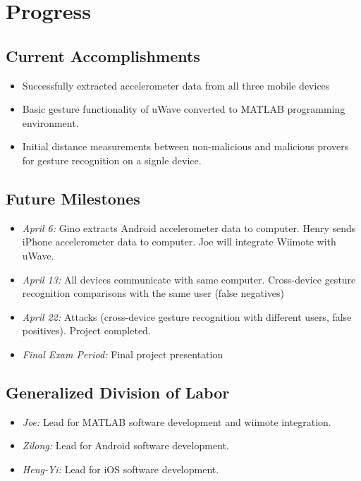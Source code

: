 
\section{Progress}
\label{sec:Progress}

\subsection{Current Accomplishments}

\begin{itemize}
\item Successfully extracted accelerometer data from all three mobile devices
\item Basic gesture functionality of uWave converted to MATLAB programming environment.
\item Initial distance measurements between non-malicious and malicious provers for gesture recognition on a signle device.
\end{itemize}

\subsection{Future Milestones}

\begin{itemize}
\item \emph{April 6:} Gino extracts Android accelerometer data to computer. Henry sends iPhone accelerometer data to computer. Joe will integrate Wiimote with uWave.  
\item \emph{April 13:} All devices communicate with same computer. Cross-device gesture recognition comparisons with the same user (false negatives)
\item \emph{April 22:} Attacks (cross-device gesture recognition with different users, false positives). Project completed. 
\item \emph{Final Exam Period:} Final project presentation
\end{itemize}

\subsection{Generalized Division of Labor}

\begin{itemize}
\item \emph{Joe:} Lead for MATLAB software development and wiimote integration.
\item \emph{Zilong:} Lead for Android software development. 
\item \emph{Heng-Yi:} Lead for iOS software development. 
\end{itemize}

